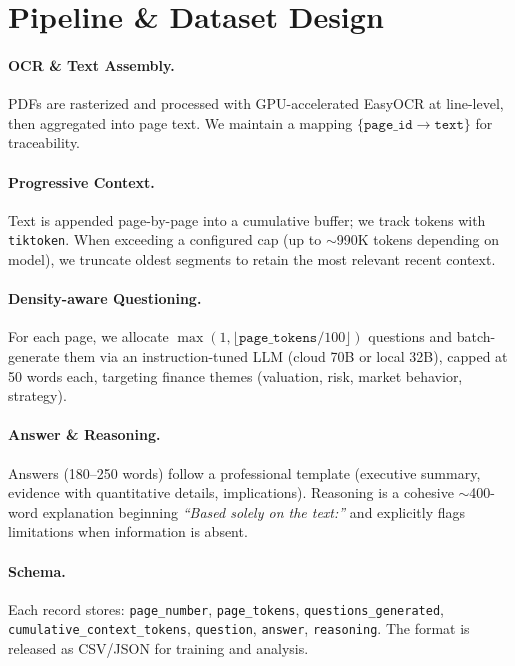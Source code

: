 \documentclass[sigconf,authordraft,anonymous]{acmart}
\begin{document}
\section{Pipeline \& Dataset Design}
\paragraph{OCR \& Text Assembly.}
PDFs are rasterized and processed with GPU-accelerated EasyOCR at line-level, then aggregated into page text. We maintain a mapping $\{\texttt{page\_id} \rightarrow \texttt{text}\}$ for traceability.

\paragraph{Progressive Context.}
Text is appended page-by-page into a cumulative buffer; we track tokens with \texttt{tiktoken}. When exceeding a configured cap (up to $\sim$990K tokens depending on model), we truncate oldest segments to retain the most relevant recent context.

\paragraph{Density-aware Questioning.}
For each page, we allocate $\max(1, \lfloor \texttt{page\_tokens}/100 \rfloor)$ questions and batch-generate them via an instruction-tuned LLM (cloud 70B or local 32B), capped at 50 words each, targeting finance themes (valuation, risk, market behavior, strategy).

\paragraph{Answer \& Reasoning.}
Answers (180--250 words) follow a professional template (executive summary, evidence with quantitative details, implications). Reasoning is a cohesive $\sim$400-word explanation beginning \emph{``Based solely on the text:''} and explicitly flags limitations when information is absent.

\paragraph{Schema.}
Each record stores: \texttt{page\_number}, \texttt{page\_tokens}, \texttt{questions\_generated}, \texttt{cumulative\_context\_tokens}, \texttt{question}, \texttt{answer}, \texttt{reasoning}. The format is released as CSV/JSON for training and analysis.
\end{document}

